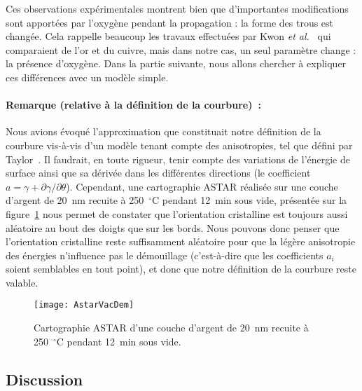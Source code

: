 Ces observations expérimentales montrent bien que d'importantes modifications sont apportées par l'oxygène pendant la propagation : la forme des trous est changée. Cela rappelle beaucoup les travaux effectuées par Kwon\textit{ et al.}~\cite{kwon2003comparison} qui comparaient de l'or et du cuivre, mais dans notre cas, un seul paramètre change : la présence d'oxygène. Dans la partie suivante, nous allons chercher à expliquer ces différences avec un modèle simple.\par 

\paragraph*{Remarque (relative à la définition de la courbure)~:}
Nous avions évoqué l'approximation que constituait notre définition de la courbure vis-à-vis d'un modèle tenant compte des anisotropies, tel que défini par Taylor~\cite{taylor1992ii}. Il faudrait, en toute rigueur, tenir compte des variations de l'énergie de surface ainsi que sa dérivée dans les différentes directions (le coefficient $a=\gamma+\partial\gamma/\partial\theta$). Cependant, une cartographie ASTAR réalisée sur une couche d'argent de 20~nm recuite à 250~$^\circ$C pendant 12~min sous vide, présentée sur la figure~\ref{astarVacDem} nous permet de constater que l'orientation cristalline est toujours aussi aléatoire au bout des doigts que sur les bords. Nous pouvons donc penser que l'orientation cristalline reste suffisamment aléatoire pour que la légère anisotropie des énergies n'influence pas le démouillage (c'est-à-dire que les coefficients $a_i$ soient semblables en tout point), et donc que notre définition de la courbure reste valable.\par 

\begin{figure}[!htb]
\centering
\texttt{[image: AstarVacDem]}
\caption{Cartographie ASTAR d'une couche d'argent de 20~nm recuite à 250~$^\circ$C pendant 12~min sous vide.}
\label{astarVacDem}
\end{figure}

		\subsection{Discussion}

